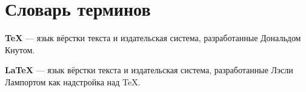 \chapter*{Словарь терминов}             %

\textbf{TeX} --- язык вёрстки текста и издательская система, разработанные Дональдом Кнутом.

\textbf{LaTeX} --- язык вёрстки текста и издательская система, разработанные Лэсли Лампортом как надстройка над TeX.

